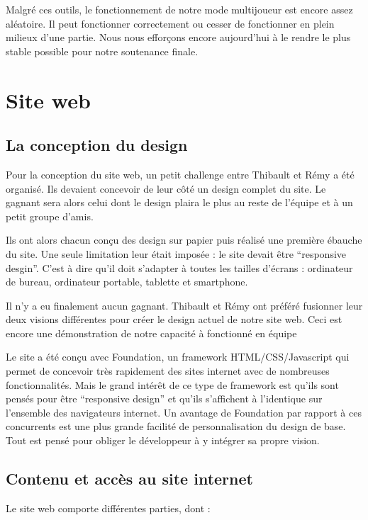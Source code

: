 \documentclass[11pt]{report}
\begin{document}
Malgré ces outils, le fonctionnement de notre mode multijoueur est encore assez aléatoire. Il peut fonctionner correctement ou cesser de fonctionner en plein milieux d'une partie. Nous nous efforçons encore aujourd'hui à le rendre le plus stable possible pour notre soutenance finale.

\chapter{Site web}

\section{La conception du design}

Pour la conception du site web, un petit challenge entre Thibault et Rémy a été organisé. Ils devaient concevoir de leur côté un design complet du site. Le gagnant sera alors celui dont le design plaira le plus au reste de l'équipe et à un petit groupe d'amis.

Ils ont alors chacun conçu des design sur papier puis réalisé une première ébauche du site. Une seule limitation leur était imposée : le site devait être ``responsive desgin''. C'est à dire qu'il doit s'adapter à toutes les tailles d'écrans : ordinateur de bureau, ordinateur portable, tablette et smartphone.

Il n'y a eu finalement aucun gagnant. Thibault et Rémy ont préféré fusionner leur deux visions différentes pour créer le design actuel de notre site web. Ceci est encore une démonstration de notre capacité à fonctionné en équipe

Le site a été conçu avec Foundation, un framework HTML/CSS/Javascript qui permet de concevoir très rapidement des sites internet avec de nombreuses fonctionnalités. Mais le grand intérêt de ce type de framework est qu'ils sont pensés pour être ``responsive design'' et qu'ils s'affichent à l'identique sur l'ensemble des navigateurs internet. Un avantage de Foundation par rapport à ces concurrents est une plus grande facilité de personnalisation du design de base. Tout est pensé pour obliger le développeur à y intégrer sa propre vision.

\section{Contenu et accès au site internet}

Le site web comporte différentes parties, dont :
\end{document}
